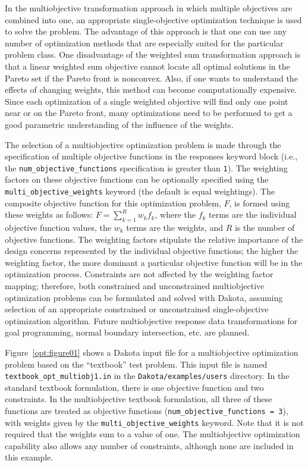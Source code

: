 In the multiobjective transformation approach in which multiple
objectives are combined into one, an appropriate single-objective
optimization technique is used to solve the problem.  The advantage of
this approach is that one can use any number of optimization methods
that are especially suited for the particular problem class. One
disadvantage of the weighted sum transformation approach is that a
linear weighted sum objective cannot locate all optimal solutions in
the Pareto set if the Pareto front is nonconvex.  Also, if one wants
to understand the effects of changing weights, this method can become
computationally expensive.  Since each optimization of a single
weighted objective will find only one point near or on the Pareto
front, many optimizations need to be performed to get a good
parametric understanding of the influence of the weights.

The selection of a multiobjective optimization problem is made through
the specification of multiple objective functions in the responses
keyword block (i.e., the \texttt{num\_objective\_functions}
specification is greater than \texttt{1}). The weighting factors on
these objective functions can be optionally specified using the
\texttt{multi\_objective\_weights} keyword (the default is equal
weightings). The composite objective function for this optimization
problem, $F$, is formed using these weights as follows:
$F=\sum_{k=1}^{R}w_{k}f_{k}$, where the $f_{k}$ terms are the
individual objective function values, the $w_{k}$ terms are the
weights, and $R$ is the number of objective functions. The weighting
factors stipulate the relative importance of the design concerns
represented by the individual objective functions; the higher the
weighting factor, the more dominant a particular objective function
will be in the optimization process.  Constraints are not affected by
the weighting factor mapping; therefore, both constrained and
unconstrained multiobjective optimization problems can be formulated
and solved with Dakota, assuming selection of an appropriate
constrained or unconstrained single-objective optimization algorithm.
Future multiobjective response data transformations for goal
programming, normal boundary intersection, etc. are planned.

Figure~\ref{opt:figure01} shows a Dakota input file for a
multiobjective optimization problem based on the ``textbook'' test
problem. This input file is named \texttt{textbook\_opt\_multiobj1.in} in the
\texttt{Dakota/examples/users} directory. In the standard textbook formulation,
there is one objective function and two constraints. In the
multiobjective textbook formulation, all three of these functions are
treated as objective functions (\texttt{num\_objective\_functions =
  3}), with weights given by the \texttt{multi\_objective\_weights}
keyword.  Note that it is not required that the weights sum to a value
of one.  The multiobjective optimization capability also allows any
number of constraints, although none are included in this example.

